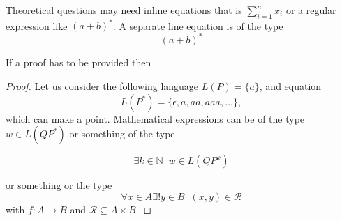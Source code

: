\documentclass[a4 paper]{article}
\DeclareMathOperator{\st}{\backepsilon^{'}}
\begin{document}
\begin{flushright}
\end{flushright}

\newpage
\vspace{5mm}

Theoretical questions may need inline equations that is $\sum_{i=1}^n x_i$ or a regular expression like $\left(a+b\right)^*$. A separate line equation is of the type
\begin{equation*}
    \left(a+b\right)^*
\end{equation*}

If a proof has to be provided then
\begin{proof}
Let us consider the following language $L\left(P\right)= \lbrace a \rbrace$, and equation
\begin{equation*}
    L\left(P^*\right)=\lbrace \epsilon, a, aa, aaa, \ldots \rbrace,
\end{equation*} 
\noindent which can make a point. Mathematical expressions can be of the type  $w \in L\left(QP^*\right)$ or something of the type 

\begin{equation*}
  \exists k \in \mathbb{N} \st  w \in L\left(QP^k\right)
\end{equation*}

\noindent or something or the type 
\begin{equation*}
  \forall x \in A \exists ! y \in B \st  \left(x, y \right) \in \mathcal{R}
\end{equation*}
\noindent with $f:A \to B$ and $\mathcal{R} \subseteq A \times B$.

\end{proof}

\begin{flushright}
\end{flushright}
\end{document}

